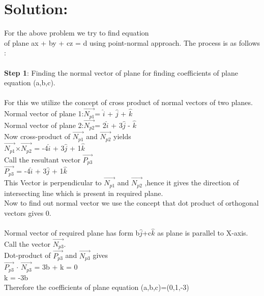 \documentclass[twocolumn]{article}
\begin{document}
\section*{Solution:}
For the above problem we try to find equation
\\ of plane ax + by + cz = d using point-normal approach.
The process is as follows :
\\
\\\textbf{Step 1}: Finding the normal vector of plane for finding coefficients of plane equation (a,b,c).
\\
\\ For this we utilize the concept of cross product of normal vectors of two planes.
\\\hspace*{0.5cm} Normal vector of plane 1:$\vec{N_{p1}}$= $\hat{i}$  + $\hat{j}$  + $\hat{k}$
\\\hspace*{0.5cm} Normal vector of plane 2:$\vec{N_{p2}}$= 2$\hat{i}$ + 3$\hat{j}$ - $\hat{k}$
\\Now cross-product of $\vec{N_{p1}}$ and $\vec{N_{p2}}$ yields
\\\hspace*{1.5cm}$\vec{N_{p1}}$$\times$$\vec{N_{p2}}$ = -4$\hat{i}$ + 3$\hat{j}$ + 1$\hat{k}$
\\Call the resultant vector  $\vec{P_{p3}}$
\\\hspace*{1.5cm}$\vec{P_{p3}}$ = -4$\hat{i}$ + 3$\hat{j}$ + 1$\hat{k}$
\\This Vector is perpendicular to $\vec{N_{p1}}$ and $\vec{N_{p2}}$ ,hence it gives the direction of intersecting line  which is present in required plane. 
\\Now to find out normal vector we use the concept that dot product of orthogonal vectors gives 0.
\\
\\Normal vector of required plane has form b$\hat{j}$+c$\hat{k}$ as plane is parallel to X-axis. Call the vector $\vec{N_{p3}}$.
\\Dot-product of $\vec{P_{p3}}$ and $\vec{N_{p3}}$ gives
\\\hspace*{1.5cm}$\vec{P_{p3}}$ $\cdot$ $\vec{N_{p3}}$ =  3b + k = 0
\\\hspace*{2.65cm} k = -3b
\\Therefore the coefficients of plane equation (a,b,c)=(0,1,-3)
\\
\end{document}
